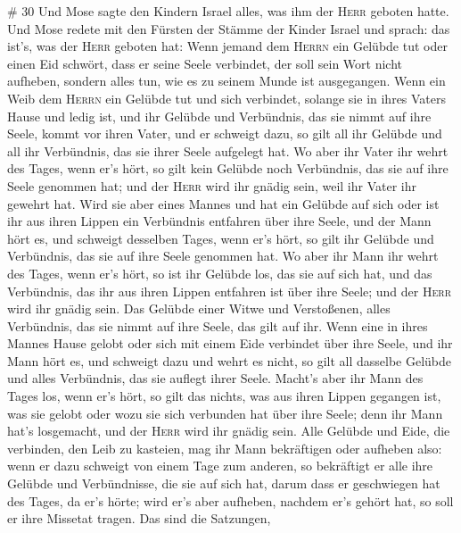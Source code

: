 \# 30  Und Mose sagte den Kindern Israel alles, was ihm
der \textsc{Herr} geboten hatte.  Und Mose redete mit den
Fürsten der Stämme der Kinder Israel und sprach: das ist's, was der
\textsc{Herr} geboten hat:  Wenn jemand dem \textsc{Herrn}
ein Gelübde tut oder einen Eid schwört, dass er seine Seele verbindet,
der soll sein Wort nicht aufheben, sondern alles tun, wie es zu seinem
Munde ist ausgegangen.  Wenn ein Weib dem \textsc{Herrn}
ein Gelübde tut und sich verbindet, solange sie in ihres Vaters Hause
und ledig ist,  und ihr Gelübde und Verbündnis, das sie
nimmt auf ihre Seele, kommt vor ihren Vater, und er schweigt dazu, so
gilt all ihr Gelübde und all ihr Verbündnis, das sie ihrer Seele
aufgelegt hat.  Wo aber ihr Vater ihr wehrt des Tages,
wenn er's hört, so gilt kein Gelübde noch Verbündnis, das sie auf ihre
Seele genommen hat; und der \textsc{Herr} wird ihr gnädig sein, weil ihr
Vater ihr gewehrt hat.  Wird sie aber eines Mannes und hat
ein Gelübde auf sich oder ist ihr aus ihren Lippen ein Verbündnis
entfahren über ihre Seele,  und der Mann hört es, und
schweigt desselben Tages, wenn er's hört, so gilt ihr Gelübde und
Verbündnis, das sie auf ihre Seele genommen hat.  Wo aber
ihr Mann ihr wehrt des Tages, wenn er's hört, so ist ihr Gelübde los,
das sie auf sich hat, und das Verbündnis, das ihr aus ihren Lippen
entfahren ist über ihre Seele; und der \textsc{Herr} wird ihr gnädig
sein.  Das Gelübde einer Witwe und Verstoßenen, alles
Verbündnis, das sie nimmt auf ihre Seele, das gilt auf ihr.
 Wenn eine in ihres Mannes Hause gelobt oder sich mit
einem Eide verbindet über ihre Seele,  und ihr Mann hört
es, und schweigt dazu und wehrt es nicht, so gilt all dasselbe Gelübde
und alles Verbündnis, das sie auflegt ihrer Seele. 
Macht's aber ihr Mann des Tages los, wenn er's hört, so gilt das nichts,
was aus ihren Lippen gegangen ist, was sie gelobt oder wozu sie sich
verbunden hat über ihre Seele; denn ihr Mann hat's losgemacht, und der
\textsc{Herr} wird ihr gnädig sein.  Alle Gelübde und
Eide, die verbinden, den Leib zu kasteien, mag ihr Mann bekräftigen oder
aufheben also:  wenn er dazu schweigt von einem Tage zum
anderen, so bekräftigt er alle ihre Gelübde und Verbündnisse, die sie
auf sich hat, darum dass er geschwiegen hat des Tages, da er's hörte;
 wird er's aber aufheben, nachdem er's gehört hat, so
soll er ihre Missetat tragen.  Das sind die Satzungen,
